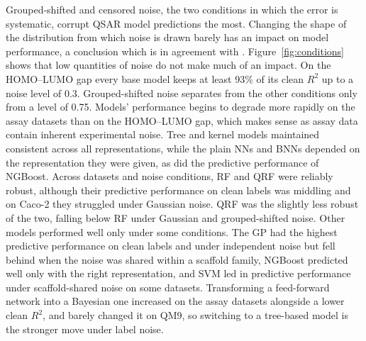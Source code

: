 Grouped-shifted and censored noise, the two conditions in which the error is systematic, corrupt QSAR model predictions the most. Changing the shape of the distribution from which noise is drawn barely has an impact on model performance, a conclusion which is in agreement with \citet{Heid2023}.
Figure~\ref{fig:conditions} shows that low quantities of noise do not make much of an impact. On the HOMO--LUMO gap every base model keeps at least 93\% of its clean $R^2$ up to a noise level of 0.3. Grouped-shifted noise separates from the other conditions only from a level of 0.75. Models' performance begins to degrade more rapidly on the assay datasets than on the HOMO--LUMO gap, which makes sense as assay data contain inherent experimental noise. Tree and kernel models maintained consistent \aucnorm{} across all representations, while the plain NNs and BNNs depended on the representation they were given, as did the predictive performance of NGBoost. Across datasets and noise conditions, RF and QRF were reliably robust, although their predictive performance on clean labels was middling and on Caco-2 they struggled under Gaussian noise. QRF was the slightly less robust of the two, falling below RF under Gaussian and grouped-shifted noise. Other models performed well only under some conditions. The GP had the highest predictive performance on clean labels and under independent noise but fell behind when the noise was shared within a scaffold family, NGBoost predicted well only with the right representation, and SVM led in predictive performance under scaffold-shared noise on some datasets. Transforming a feed-forward network into a Bayesian one increased \aucnorm{} on the assay datasets alongside a lower clean $R^2$, and barely changed it on QM9, so switching to a tree-based model is the stronger move under label noise.

